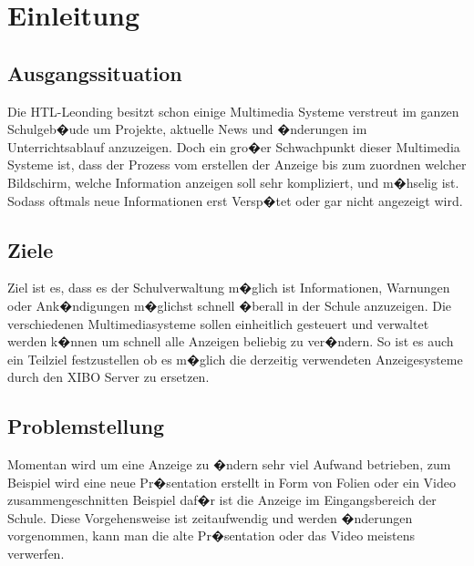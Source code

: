 \chapter{Einleitung}
\section{Ausgangssituation}
Die HTL-Leonding besitzt schon einige Multimedia Systeme verstreut im ganzen Schulgeb�ude um Projekte, aktuelle News und �nderungen im Unterrichtsablauf anzuzeigen. Doch ein gro�er Schwachpunkt dieser Multimedia Systeme ist, dass der Prozess vom erstellen der Anzeige bis zum zuordnen welcher Bildschirm, welche Information anzeigen soll sehr kompliziert, und m�hselig ist. Sodass oftmals neue Informationen erst Versp�tet oder gar nicht angezeigt wird. 

\section{Ziele}
Ziel ist es, dass es der Schulverwaltung m�glich ist Informationen, Warnungen oder Ank�ndigungen m�glichst schnell �berall in der Schule anzuzeigen. Die verschiedenen Multimediasysteme sollen einheitlich gesteuert und verwaltet werden k�nnen um schnell alle Anzeigen beliebig zu ver�ndern. So ist es auch ein Teilziel festzustellen ob es m�glich die derzeitig verwendeten Anzeigesysteme durch den XIBO Server zu ersetzen.

\section{Problemstellung}
Momentan wird um eine Anzeige zu �ndern sehr viel Aufwand betrieben, zum Beispiel wird eine neue Pr�sentation erstellt in Form von Folien oder ein Video zusammengeschnitten Beispiel daf�r ist die Anzeige im Eingangsbereich der Schule. Diese Vorgehensweise ist zeitaufwendig und werden �nderungen vorgenommen, kann man die alte Pr�sentation oder das Video meistens verwerfen.

